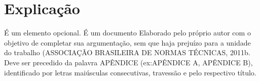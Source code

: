 \chapter{Explicação}
\label{apendice: a}

É um elemento opcional. É um documento Elaborado pelo próprio autor com o objetivo de completar sua argumentação, sem que haja prejuízo para a unidade do trabalho (ASSOCIAÇÃO BRASILEIRA DE NORMAS TÉCNICAS, 2011b. Deve ser precedido da palavra APÊNDICE (ex:APÊNDICE A, APÊNDICE B), identificado por letras maiúsculas consecutivas, travessão e pelo respectivo título. 
